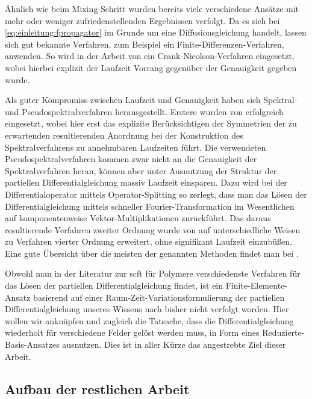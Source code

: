 Ähnlich wie beim Mixing-Schritt wurden bereits viele verschiedene Ansätze mit mehr oder weniger zufriedenstellenden Ergebnissen verfolgt.
Da es sich bei \eqref{eq:einleitung:fpropagator} im Grunde um eine Diffusionsgleichung handelt, lassen sich gut bekannte Verfahren, zum Beispiel ein Finite-Differenzen-Verfahren, anwenden.
So wird in der Arbeit von \textcite{Drolet:1999bs} ein Crank-Nicolson-Verfahren eingesetzt, wobei hierbei explizit der Laufzeit Vorrang gegenüber der Genauigkeit gegeben wurde.

Als guter Kompromiss zwischen Laufzeit und Genauigkeit haben sich Spektral- und Pseudospektralverfahren herausgestellt.
Erstere wurden von \textcite{Matsen:1994bz} erfolgreich eingesetzt, wobei hier erst das explizite Berücksichtigen der Symmetrien der zu erwartenden resultierenden Anordnung bei der Konstruktion des Spektralverfahrens zu annehmbaren Laufzeiten führt.
Die verwendeten Pseudospektralverfahren kommen zwar nicht an die Genauigkeit der Spektralverfahren heran, können aber unter Ausnutzung der Struktur der partiellen Differentialgleichung massiv Laufzeit einsparen.
Dazu wird bei \textcite{Rasmussen:2002kt} der Differentialoperator mittels Operator-Splitting so zerlegt, dass man das Lösen der Differentialgleichung mittels schneller Fourier-Transformation im Wesentlichen auf komponentenweise Vektor-Multiplikationen zurückführt.
Das daraus resultierende Verfahren zweiter Ordnung wurde von \textcite{GarciaCervera:2006uu,Ranjan:2007kl} auf unterschiedliche Weisen zu Verfahren vierter Ordnung erweitert, ohne signifikant Laufzeit einzubüßen.
Eine gute Übersicht über die meisten der genannten Methoden findet man bei \textcites[Section 3.6]{Fredrickson:2006th}{Audus:2013ep}.

Obwohl man in der Literatur zur \ac{scft} für Polymere verschiedenste Verfahren für das Lösen der partiellen Differentialgleichung findet, ist ein Finite-Elemente-Ansatz basierend auf einer Raum-Zeit-Variationsformulierung der partiellen Differentialgleichung unseres Wissens nach bisher nicht verfolgt worden.
Hier wollen wir anknüpfen und zugleich die Tatsache, dass die Differentialgleichung wiederholt für verschiedene Felder gelöst werden muss, in Form eines Reduzierte-Basis-Ansatzes ausnutzen.
Dies ist in aller Kürze das angestrebte Ziel dieser Arbeit.


\subsection*{Aufbau der restlichen Arbeit}

